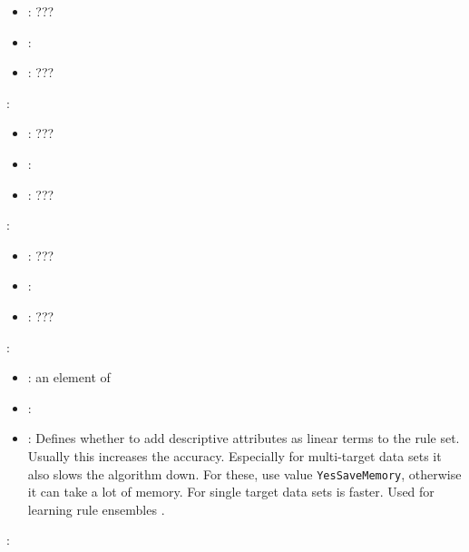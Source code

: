 \begin{itemize}
{           \begin{itemize}
                \item \optionPossibleValues{}: ???
                \item \optionDefaultValue{}: 
                \item \optionDescrption{}: ???
           \end{itemize}
    \item {}:
           \begin{itemize}
                \item \optionPossibleValues{}: ???
                \item \optionDefaultValue{}: 
                \item \optionDescrption{}: ???
           \end{itemize}
    \item {}:
           \begin{itemize}
                \item \optionPossibleValues{}: ???
                \item \optionDefaultValue{}: 
                \item \optionDescrption{}: ???
           \end{itemize}
    }
    \item {}:
           \begin{itemize}
                \item \optionPossibleValues{}: an element of 
                \item \optionDefaultValue{}: 
                \item \optionDescrption{}: Defines whether to add descriptive attributes as linear terms to the rule set. Usually this increases the accuracy.
                Especially for multi-target data sets it also slows the algorithm down. For these, use value \texttt{YesSaveMemory}, otherwise it can take a lot of memory.
                For single target data sets  is faster. Used for learning rule ensembles \cite{Aho2009}.
           \end{itemize}
    \item {}:
           \begin{itemize}

\end{itemize}
\end{itemize}
